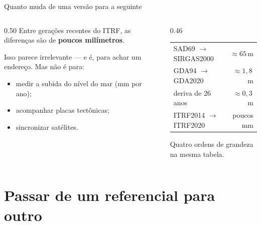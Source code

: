 \documentclass[aspectratio=169,11pt]{beamer}
\newcommand{\bnum}[1]{\textbf{\textcolor{mTeal}{#1}}}
\begin{document}
\begin{frame}{Quanto muda de uma versão para a seguinte}
  \begin{columns}[T]
    \begin{column}{0.50\textwidth}
      Entre gerações recentes do ITRF, as diferenças são de \bnum{poucos milímetros}.
      \medskip

      Isso parece irrelevante --- e é, para achar um endereço. Mas não é para:
      \begin{itemize}
        \item medir a subida do nível do mar (mm por ano);
        \item acompanhar placas tectônicas;
        \item sincronizar satélites.
      \end{itemize}
    \end{column}
    \begin{column}{0.46\textwidth}
      \begin{ideia}[title={A escala das coisas}]
        \scriptsize
        \renewcommand{\arraystretch}{1.3}
        \begin{tabular}{@{}lr@{}}
          SAD69 $\to$ SIRGAS2000 & $\approx 65$\,m \\
          GDA94 $\to$ GDA2020 & $\approx 1{,}8$\,m \\
          deriva de 26 anos & $\approx 0{,}3$\,m \\
          ITRF2014 $\to$ ITRF2020 & poucos mm \\
        \end{tabular}
      \end{ideia}
      \medskip
      {\small Quatro ordens de grandeza na mesma tabela.}
    \end{column}
  \end{columns}
\end{frame}

\section{Passar de um referencial para outro}
\end{document}
